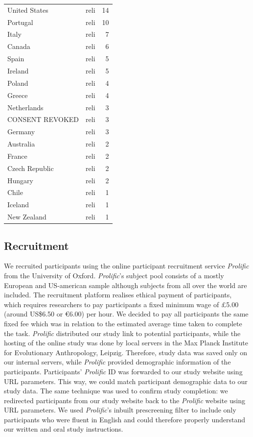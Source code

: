 \documentclass[
  man,floatsintext]{apa6}
\begin{document}
\begin{longtable}{llr}
United States & reli & 14\\
Portugal & reli & 10\\
\addlinespace
Italy & reli & 7\\
Canada & reli & 6\\
Spain & reli & 5\\
Ireland & reli & 5\\
Poland & reli & 4\\
\addlinespace
Greece & reli & 4\\
Netherlands & reli & 3\\
CONSENT REVOKED & reli & 3\\
Germany & reli & 3\\
Australia & reli & 2\\
\addlinespace
France & reli & 2\\
Czech Republic & reli & 2\\
Hungary & reli & 2\\
Chile & reli & 1\\
Iceland & reli & 1\\
\addlinespace
New Zealand & reli & 1\\*
\end{longtable}

\hypertarget{recruitment}{%
\subsection{Recruitment}\label{recruitment}}

We recruited participants using the online participant recruitment service \emph{Prolific} from the University of Oxford.
\emph{Prolific}'s subject pool consists of a mostly European and US-american sample although subjects from all over the world are included.
The recruitment platform realises ethical payment of participants, which requires researchers to pay participants a fixed minimum wage of £5.00 (around US\$6.50 or €6.00) per hour.
We decided to pay all participants the same fixed fee which was in relation to the estimated average time taken to complete the task.
\emph{Prolific} distributed our study link to potential participants, while the hosting of the online study was done by local servers in the Max Planck Institute for Evolutionary Anthropology, Leipzig.
Therefore, study data was saved only on our internal servers, while \emph{Prolific} provided demographic information of the participants.
Participants' \emph{Prolific} ID was forwarded to our study website using URL parameters.
This way, we could match participant demographic data to our study data.
The same technique was used to confirm study completion: we redirected participants from our study website back to the \emph{Prolific} website using URL parameters.
We used \emph{Prolific}'s inbuilt prescreening filter to include only participants who were fluent in English and could therefore properly understand our written and oral study instructions.
\end{document}
